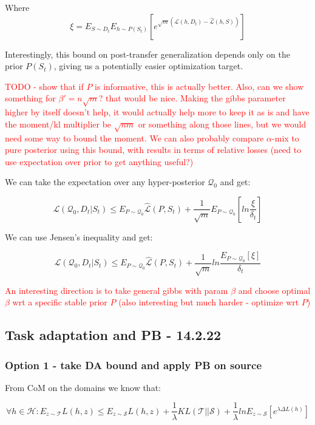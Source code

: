 \documentclass[letterpaper]{article}
\theoremstyle{definition}
\begin{document}
Where $$\xi=E_{S\sim D_t}E_{h\sim P(S_t)}\left [e^{\sqrt{m}(\mathcal{L}(h, D_t)-\hat{\mathcal{L}}(h, S))} \right ]$$

Interestingly, this bound on post-transfer generalization depends only on the prior $P(S_t)$, giving us a potentially easier optimization target.

\textcolor{red}{TODO - show that if $P$ is informative, this is actually better. Also, can we show something for $\beta'=n\sqrt{m}$? that would be nice. Making the gibbs parameter higher by itself doesn't help, it would actually help more to keep it as is and have the moment/kl multiplier be $\sqrt{nm}$ or something along those lines, but we would need some way to bound the moment.
	We can also probably compare $\alpha$-mix to pure posterior using this bound, with results in terms of relative losses (need to use expectation over prior to get anything useful?)}

We can take the expectation over any hyper-posterior $\mathcal{Q}_0$ and get:

$$\mathcal{L}(\mathcal{Q}_0, D_t|S_t) \leq E_{P\sim \mathcal{Q}_0}\hat{\mathcal{L}}(P, S_t) + \frac{1}{\sqrt{m}}E_{P\sim \mathcal{Q}_0}\left [ln\frac{\xi}{\delta_t}\right ]$$

We can use Jensen's inequality and get:

$$\mathcal{L}(\mathcal{Q}_0, D_t|S_t) \leq E_{P\sim \mathcal{Q}_0}\hat{\mathcal{L}}(P, S_t) + \frac{1}{\sqrt{m}}ln\frac{E_{P\sim \mathcal{Q}_0}\left [\xi\right ]}{\delta_t}$$

\textcolor{red}{An interesting direction is to take general gibbs with param $\beta$ and choose optimal $\beta$ wrt a specific stable prior $P$ (also interesting but much harder - optimize wrt $P$)}

\subsection{Task adaptation and PB - 14.2.22} \label{subsec:pb-adapt}

\subsubsection{Option 1 - take DA bound and apply PB on source}
From CoM on the domains we know that:

$$\forall h\in \mathcal{H}: E_{z\sim \mathcal{T}}L(h, z) \leq E_{z\sim \mathcal{S}}L(h, z) + \frac{1}{\lambda}KL(\mathcal{T}||\mathcal{S})+\frac{1}{\lambda}ln E_{z\sim \mathcal{S}}\left [e^{\lambda \Delta L(h)}\right ]  $$
\end{document}
